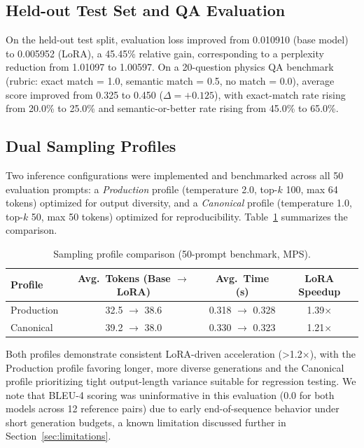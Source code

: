 \documentclass[11pt]{article}
\begin{document}
\subsection{Held-out Test Set and QA Evaluation}
On the held-out test split, evaluation loss improved from 0.010910
(base model) to 0.005952 (LoRA), a 45.45\% relative gain, corresponding to
a perplexity reduction from 1.01097 to 1.00597. On a 20-question physics QA
benchmark (rubric: exact match = 1.0, semantic match = 0.5, no match =
0.0), average score improved from 0.325 to 0.450 ($\Delta=+0.125$), with
exact-match rate rising from 20.0\% to 25.0\% and semantic-or-better rate
rising from 45.0\% to 65.0\%.

\subsection{Dual Sampling Profiles}
Two inference configurations were implemented and benchmarked across all
50 evaluation prompts: a \emph{Production} profile (temperature 2.0, top-$k$
100, max 64 tokens) optimized for output diversity, and a \emph{Canonical}
profile (temperature 1.0, top-$k$ 50, max 50 tokens) optimized for
reproducibility. Table~\ref{tab:profiles} summarizes the comparison.

\begin{table}[h]
\centering
\caption{Sampling profile comparison (50-prompt benchmark, MPS).}
\label{tab:profiles}
\begin{tabular}{@{}lccc@{}}
\toprule
Profile & Avg.\ Tokens (Base $\rightarrow$ LoRA) & Avg.\ Time (s) & LoRA Speedup \\
\midrule
Production & 32.5 $\rightarrow$ 38.6 & 0.318 $\rightarrow$ 0.328 & 1.39$\times$ \\
Canonical & 39.2 $\rightarrow$ 38.0 & 0.330 $\rightarrow$ 0.323 & 1.21$\times$ \\
\bottomrule
\end{tabular}
\end{table}

Both profiles demonstrate consistent LoRA-driven acceleration (\textgreater{}1.2$\times$),
with the Production profile favoring longer, more diverse generations and the
Canonical profile prioritizing tight output-length variance suitable for
regression testing. We note that BLEU-4 scoring was uninformative in this
evaluation (0.0 for both models across 12 reference pairs) due to early
end-of-sequence behavior under short generation budgets, a known limitation
discussed further in Section~\ref{sec:limitations}.
\end{document}
